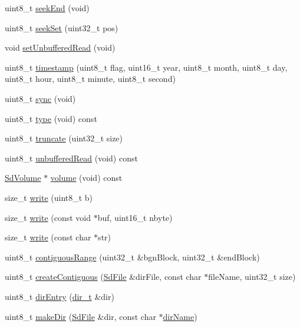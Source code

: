 \begin{DoxyCompactItemize}
uint8\+\_\+t \hyperlink{class_sd_file_afa70bc7ba5eb789aee1b62fc5fafaa5b}{seek\+End} (void)
\item 
uint8\+\_\+t \hyperlink{class_sd_file_a5b8ea0ba6a9fec1ee8f1b11e90edb0c6}{seek\+Set} (uint32\+\_\+t pos)
\item 
void \hyperlink{class_sd_file_a08c9e76a4a7bb43fccf1dd5c72c66a16}{set\+Unbuffered\+Read} (void)
\item 
uint8\+\_\+t \hyperlink{class_sd_file_a249632ba9580c556c0b041d6b2aaf224}{timestamp} (uint8\+\_\+t flag, uint16\+\_\+t year, uint8\+\_\+t month, uint8\+\_\+t day, uint8\+\_\+t hour, uint8\+\_\+t minute, uint8\+\_\+t second)
\item 
uint8\+\_\+t \hyperlink{class_sd_file_a742d64ca964583ac3a92b31f0eba5e14}{sync} (void)
\item 
uint8\+\_\+t \hyperlink{class_sd_file_a3684bcce87f22a84f96cd342aa5a034b}{type} (void) const 
\item 
uint8\+\_\+t \hyperlink{class_sd_file_ade1e2b72f89b24f500502518fd678abd}{truncate} (uint32\+\_\+t size)
\item 
uint8\+\_\+t \hyperlink{class_sd_file_a6ce5bb460683272d8c86d02286622bb6}{unbuffered\+Read} (void) const 
\item 
\hyperlink{class_sd_volume}{Sd\+Volume} $\ast$ \hyperlink{class_sd_file_a96fbab54b98a17f2e4fd54c086fe1ff3}{volume} (void) const 
\item 
size\+\_\+t \hyperlink{class_sd_file_a67267a4b63d03a16e099195935613006}{write} (uint8\+\_\+t b)
\item 
size\+\_\+t \hyperlink{class_sd_file_a94d4541fda63b5390c8e97ebe815115a}{write} (const void $\ast$buf, uint16\+\_\+t nbyte)
\item 
size\+\_\+t \hyperlink{class_sd_file_ad74aaa9115724d663ee39e6dd2d808f8}{write} (const char $\ast$str)
\item 
uint8\+\_\+t \hyperlink{class_sd_file_a872927812be6c48a894bdfc72f1701a1}{contiguous\+Range} (uint32\+\_\+t \&bgn\+Block, uint32\+\_\+t \&end\+Block)
\item 
uint8\+\_\+t \hyperlink{class_sd_file_a231dd495e5c5997aea2a842481a68f40}{create\+Contiguous} (\hyperlink{class_sd_file}{Sd\+File} \&dir\+File, const char $\ast$file\+Name, uint32\+\_\+t size)
\item 
uint8\+\_\+t \hyperlink{class_sd_file_ae7b4b1057a1ee17f673c116771636156}{dir\+Entry} (\hyperlink{_fat_structs_8h_a803db59d4e16a0c54a647afc6a7954e3}{dir\+\_\+t} \&dir)
\item 
uint8\+\_\+t \hyperlink{class_sd_file_af87e166d0059d392d7038f68fca68529}{make\+Dir} (\hyperlink{class_sd_file}{Sd\+File} \&dir, const char $\ast$\hyperlink{class_sd_file_ad7bbb106aa4c96c795c88b33def677bc}{dir\+Name})

\end{DoxyCompactItemize}
